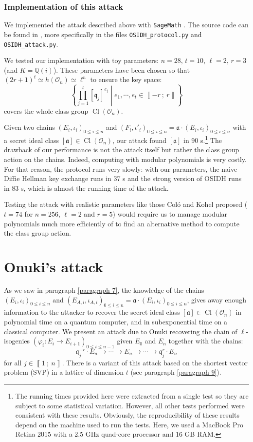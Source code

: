 \documentclass[a4paper,10pt]{report}
\theoremstyle{definition}
\theoremstyle{plain}
\theoremstyle{definition}
\newcommand{\Q}{\mathbb{Q}}
\newcommand{\mO}{\mathcal{O}}
\renewcommand{\i}[2]{\left\llbracket #1~;~#2\right\rrbracket}
\renewcommand{\(}{\left(}
\renewcommand{\)}{\right)}
\newcommand{\mf}[1]{\mathfrak{#1}}
\DeclareMathOperator{\Cl}{Cl}
\begin{document}
\subsubsection{Implementation of this attack}\label{paragraph 18}

We implemented the attack described above with \verb?SageMath? \cite{sagemath}.  The source code can be found in \cite{MyGithub}, more specifically in the files \verb?OSIDH_protocol.py? and \verb?OSIDH_attack.py?.

We tested our implementation with toy parameters: $n=28$, $t=10$,
$\ell=2$, $r=3$ (and $K=\Q(i)$). These parameters have been chosen so that $(2r+1)^t\simeq h(\mO_n)\simeq \ell^n$ to ensure the key space:
\[\left\{\prod_{j=1}^t[\mf{q}_j]^{e_j}\middle| e_1, \cdots, e_t\in\i{-r}{r}\right\}\]
covers the whole class group $\Cl(\mO_n)$.

Given two chains $(E_i,\iota_i)_{0\leq i\leq n}$ and $(F_i,\iota'_i)_{0\leq i\leq n}=\mf{a}\cdot(E_i,\iota_i)_{0\leq i\leq n}$ with a secret ideal class $[\mf{a}]\in\Cl(\mO_n)$, our attack found $[\mf{a}]$ in 90 s.\footnote{The running times provided here were extracted from a single test so they are subject to some statistical variation. However, all other tests performed were consistent with these results.  Obviously, the reproducibility of these results depend on the machine used to run the tests.  Here, we used a MacBook Pro Retina 2015 with a 2.5 GHz quad-core processor and 16 GB RAM.} The drawback of our performance is not the attack itself but rather the class group action on the chains. Indeed, computing with modular polynomials is very costly.  For that reason, the protocol runs very slowly: with our parameters, the naive Diffie Hellman key exchange runs in 37 s and the strong version of OSIDH runs in 83 s, which is almost the running time of the attack. 

Testing the attack with realistic parameters like those Col\'{o} and Kohel proposed ($t=74$ for $n=256$, $\ell=2$ and $r=5$) would require us to manage modular polynomials much more efficiently of to find an alternative method to compute the class group action.

\section{Onuki's attack}

As we saw in paragraph \ref{paragraph 7}, the knowledge of the chains $(E_i,\iota_i)_{0\leq i\leq n}$ and $(E_{A,i},\iota_{A,i})_{0\leq i\leq n}=\mf{a}\cdot (E_i,\iota_i)_{0\leq i\leq n}$, gives away enough information to the attacker to recover the secret ideal class $[\mf{a}]\in\Cl(\mO_n)$ in polynomial time on a quantum computer, and in subexponential time on a classical computer.  We present an attack due to Onuki \cite[§ 6.3]{Onuki} recovering the chain of $\ell$-isogenies $(\varphi_i : E_i\longrightarrow E_{i+1})_{0\leq i\leq n-1}$  given $E_0$ and $E_n$ together with the chains:
\[\mf{q}_j^{-r}\cdot E_n\longrightarrow \cdots \longrightarrow E_n\longrightarrow \cdots\longrightarrow \mf{q}_j^{r}\cdot E_n\]
for all $j\in\i{1}{n}$. There is a variant of this attack based on the shortest vector problem (SVP) in a lattice of dimension $t$ (see paragraph \ref{paragraph 9}).
\end{document}
